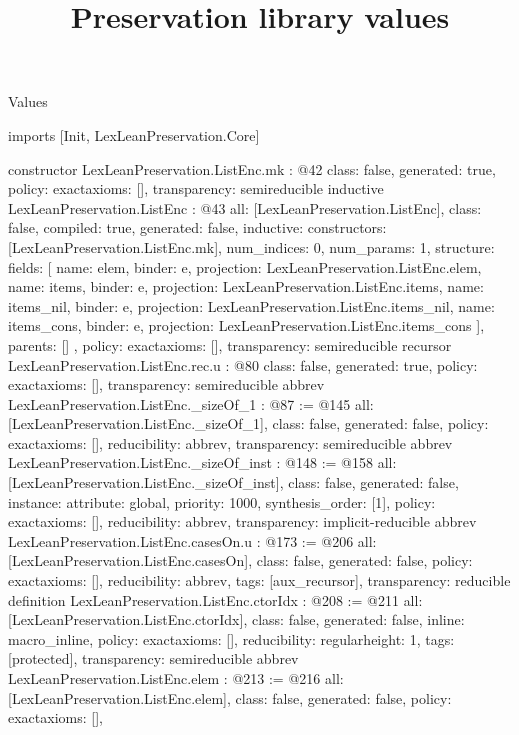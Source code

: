 \begin{lexlean}{Values}
\title{Preservation library values}
\begin{coremodule}
imports [Init, LexLeanPreservation.Core]

constructor LexLeanPreservation.ListEnc.mk : @42 {
  class: false,
  generated: true,
  policy: exact{axioms: []},
  transparency: semireducible
}
inductive LexLeanPreservation.ListEnc : @43 {
  all: [LexLeanPreservation.ListEnc],
  class: false,
  compiled: true,
  generated: false,
  inductive: {
    constructors: [LexLeanPreservation.ListEnc.mk],
    num_indices: 0,
    num_params: 1,
    structure: {
      fields: [
        {name: elem, binder: e, projection: LexLeanPreservation.ListEnc.elem},
        {name: items, binder: e, projection: LexLeanPreservation.ListEnc.items},
        {name: items_nil, binder: e, projection: LexLeanPreservation.ListEnc.items_nil},
        {name: items_cons, binder: e, projection: LexLeanPreservation.ListEnc.items_cons}
      ],
      parents: []
    }
  },
  policy: exact{axioms: []},
  transparency: semireducible
}
recursor LexLeanPreservation.ListEnc.rec.{u} : @80 {
  class: false,
  generated: true,
  policy: exact{axioms: []},
  transparency: semireducible
}
abbrev LexLeanPreservation.ListEnc._sizeOf_1 : @87 := @145 {
  all: [LexLeanPreservation.ListEnc._sizeOf_1],
  class: false,
  generated: false,
  policy: exact{axioms: []},
  reducibility: abbrev{},
  transparency: semireducible
}
abbrev LexLeanPreservation.ListEnc._sizeOf_inst : @148 := @158 {
  all: [LexLeanPreservation.ListEnc._sizeOf_inst],
  class: false,
  generated: false,
  instance: {attribute: global, priority: 1000, synthesis_order: [1]},
  policy: exact{axioms: []},
  reducibility: abbrev{},
  transparency: implicit-reducible
}
abbrev LexLeanPreservation.ListEnc.casesOn.{u} : @173 := @206 {
  all: [LexLeanPreservation.ListEnc.casesOn],
  class: false,
  generated: false,
  policy: exact{axioms: []},
  reducibility: abbrev{},
  tags: [aux_recursor],
  transparency: reducible
}
definition LexLeanPreservation.ListEnc.ctorIdx : @208 := @211 {
  all: [LexLeanPreservation.ListEnc.ctorIdx],
  class: false,
  generated: false,
  inline: macro_inline,
  policy: exact{axioms: []},
  reducibility: regular{height: 1},
  tags: [protected],
  transparency: semireducible
}
abbrev LexLeanPreservation.ListEnc.elem : @213 := @216 {
  all: [LexLeanPreservation.ListEnc.elem],
  class: false,
  generated: false,
  policy: exact{axioms: []},
}
\end{coremodule}
\end{lexlean}
